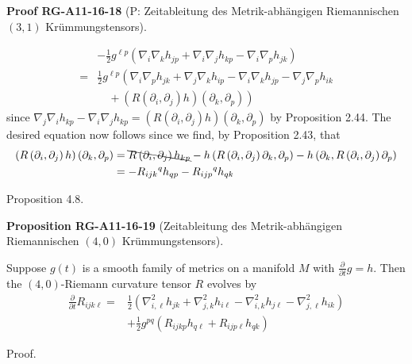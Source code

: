 \documentclass[10pt, letterpaper]{article}
\newcommand{\CustomHeading}[3]{%
  \par\medskip\noindent%
  \textbf{#1 #2} \textnormal{(#3)}.\enskip%
}
\newenvironment{PROP}[2]{\begin{unitbox}\CustomHeading{Proposition}{#1}{#2}}{\end{unitbox}}
\newenvironment{PROOF}[2]{\begin{unitbox}\CustomHeading{Proof}{#1}{#2}}{\end{unitbox}}
\begin{document}
\begin{PROOF}{RG-A11-16-18}{P: Zeitableitung des Metrik-abhängigen Riemannischen $(3,1)$ Krümmungstensors}
$$\begin{aligned}
& -\frac{1}{2} g^{\ell p}\left(\nabla_{i} \nabla_{k} h_{j p}+\nabla_{i} \nabla_{j} h_{k p}-\nabla_{i} \nabla_{p} h_{j k}\right) \\
= & \frac{1}{2} g^{\ell p}\left(\nabla_{i} \nabla_{p} h_{j k}+\nabla_{j} \nabla_{k} h_{i p}-\nabla_{i} \nabla_{k} h_{j p}-\nabla_{j} \nabla_{p} h_{i k}\right. \\
& \left.\quad+\left(R\left(\partial_{i}, \partial_{j}\right) h\right)\left(\partial_{k}, \partial_{p}\right)\right)
\end{aligned}
$$
since $\nabla_{j} \nabla_{i} h_{k p}-\nabla_{i} \nabla_{j} h_{k p}=\left(R\left(\partial_{i}, \partial_{j}\right) h\right)\left(\partial_{k}, \partial_{p}\right)$ by Proposition 2.44. The desired equation now follows since we find, by Proposition 2.43, that
$$
\begin{aligned}
\left(R\left(\partial_{i}, \partial_{j}\right) h\right)\left(\partial_{k}, \partial_{p}\right) & =\bcancel{R\left(\partial_{i}, \partial_{j}\right) h_{k p}}-h\left(R\left(\partial_{i}, \partial_{j}\right) \partial_{k}, \partial_{p}\right)-h\left(\partial_{k}, R\left(\partial_{i}, \partial_{j}\right) \partial_{p}\right) \\
& =-R_{i j k}{ }^{q} h_{q p}-R_{i j p}{ }^{q} h_{q k}
\end{aligned}
$$
\end{PROOF}




Proposition 4.8. 

\begin{PROP}{RG-A11-16-19}{Zeitableitung des Metrik-abhängigen Riemannischen $(4,0)$ Krümmungstensors}
Suppose $g(t)$ is a smooth family of metrics on a manifold $M$ with $\frac{\partial}{\partial t} g=h$. Then the $(4,0)$-Riemann curvature tensor $R$ evolves by
$$
\begin{aligned}
\frac{\partial}{\partial t} R_{i j k \ell}= & \frac{1}{2}\left(\nabla_{i, \ell}^{2} h_{j k}+\nabla_{j, k}^{2} h_{i \ell}-\nabla_{i, k}^{2} h_{j \ell}-\nabla_{j, \ell}^{2} h_{i k}\right) \\
& +\frac{1}{2} g^{p q}\left(R_{i j k p} h_{q \ell}+R_{i j p \ell} h_{q k}\right)
\end{aligned}
$$
\end{PROP}



Proof. 
\end{document}

